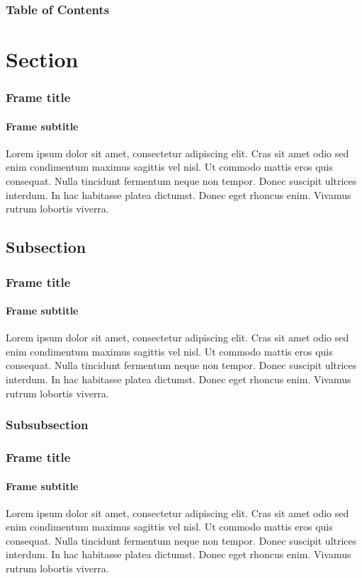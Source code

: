\documentclass[10pt, english, pdftex]{template/UC3M_slides}
\author{Aitor Alonso Núñez}         %
\begin{document}
\maketitle %

\begin{frame}
    \frametitle{Table of Contents}
    \tableofcontents
\end{frame}

\section{Section}
\begin{frame}
    \frametitle{Frame title}
    \framesubtitle{Frame subtitle}
    Lorem ipsum dolor sit amet, consectetur adipiscing elit. Cras sit amet odio sed enim condimentum maximus sagittis vel nisl. Ut commodo mattis eros quis consequat. Nulla tincidunt fermentum neque non tempor. Donec suscipit ultrices interdum. In hac habitasse platea dictumst. Donec eget rhoncus enim. Vivamus rutrum lobortis viverra.
\end{frame}

\subsection{Subsection}
\begin{frame}
    \frametitle{Frame title}
    \framesubtitle{Frame subtitle}
    Lorem ipsum dolor sit amet, consectetur adipiscing elit. Cras sit amet odio sed enim condimentum maximus sagittis vel nisl. Ut commodo mattis eros quis consequat. Nulla tincidunt fermentum neque non tempor. Donec suscipit ultrices interdum. In hac habitasse platea dictumst. Donec eget rhoncus enim. Vivamus rutrum lobortis viverra.
\end{frame}

\subsubsection{Subsubsection}
\begin{frame}
    \frametitle{Frame title}
    \framesubtitle{Frame subtitle}
    Lorem ipsum dolor sit amet, consectetur adipiscing elit. Cras sit amet odio sed enim condimentum maximus sagittis vel nisl. Ut commodo mattis eros quis consequat. Nulla tincidunt fermentum neque non tempor. Donec suscipit ultrices interdum. In hac habitasse platea dictumst. Donec eget rhoncus enim. Vivamus rutrum lobortis viverra.
\end{frame}

\maketitle %
\end{document}
